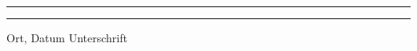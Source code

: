 \documentclass[12pt, a4paper, oneside]{article}
\begin{document}
\paragraph{}$~~$\\
\paragraph{}$~~$\\
\vspace{50pt} 
\noindent\rule{5cm}{.4pt}\hfill\rule{5cm}{.4pt}\par 
\noindent Ort, Datum \hfill Unterschrift 
\end{document}
